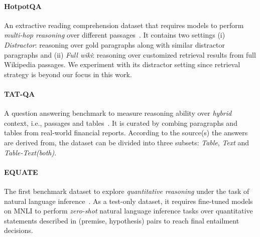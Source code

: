 \paragraph{HotpotQA} An extractive reading comprehension dataset that requires models to perform \textit{multi-hop reasoning} over different passages~\cite{yang-etal-2018-hotpotqa}.
It contains two settings (i) \textit{Distractor}: reasoning over  gold paragraphs along with  similar distractor paragraphs and (ii) \textit{Full wiki}: reasoning over customized retrieval results from full Wikipedia passages.
We experiment with its distractor setting since retrieval strategy is beyond our focus in this work.

\begin{table}[t]
  \centering
  \small
  \caption{The statistics of our experimental datasets.}
  \label{tab:dataset-data}\end{table}

\paragraph{TAT-QA} A question answering benchmark to measure reasoning ability over \textit{hybrid} context, i.e., passages and tables~\cite{zhu-etal-2021-tat}.
It is curated by combing paragraphs and tables from real-world financial reports.
According to the source(s) the answers are derived from, the dataset can be divided into three subsets: \textit{Table}, \textit{Text} and \textit{Table-Text(both)}.

\paragraph{EQUATE} The first benchmark dataset to explore \textit{quantitative reasoning} under the task of natural language inference~\cite{ravichander-etal-2019-equate}.
As a test-only dataset, it requires fine-tuned models on MNLI to perform \textit{zero-shot} natural language inference tasks over quantitative statements described in (premise, hypothesis) pairs to reach final entailment decisions.

